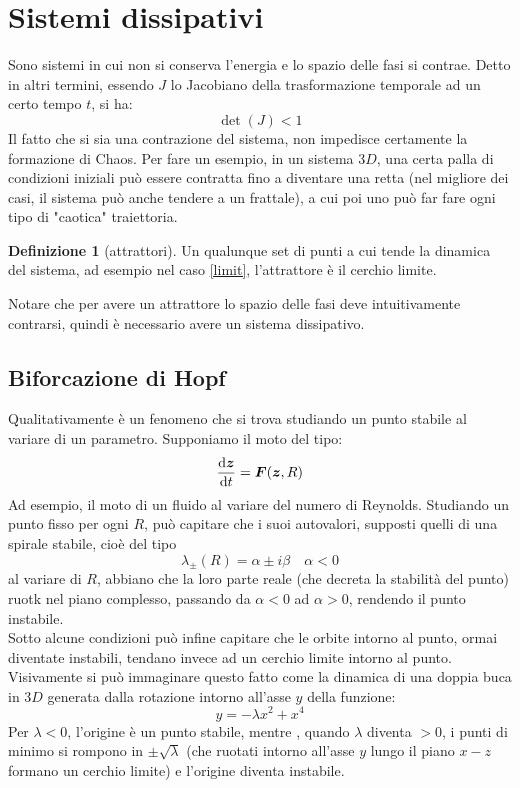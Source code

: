 \documentclass[a4paper,12pt]{article}
\theoremstyle{plain}
\renewcommand{\vec}[1]{{\boldsymbol{#1}}}
\theoremstyle{definition}
\newtheorem{defn}{Definizione}[section]
\theoremstyle{remark}
\begin{document}
	\section{Sistemi dissipativi}
Sono sistemi in cui non si conserva l'energia e lo spazio delle fasi si contrae. Detto in altri termini, essendo $J$ lo Jacobiano della trasformazione temporale ad un certo tempo $t$, si ha:
\[\det(J)<1\]
Il fatto che si sia una contrazione del sistema, non impedisce certamente la formazione di Chaos. Per fare un esempio, in un sistema $3D$, una certa palla di condizioni iniziali può essere contratta fino a diventare una retta (nel migliore dei casi, il sistema può anche tendere a un frattale), a cui poi uno può far fare ogni tipo di "caotica" traiettoria.
\begin{defn}[attrattori]
	Un qualunque set di punti a cui tende la dinamica del sistema, ad esempio nel caso \ref{limit}, l'attrattore è il cerchio limite.
	
\end{defn}
Notare che per avere un attrattore lo spazio delle fasi deve intuitivamente contrarsi,  quindi è necessario avere un sistema dissipativo.

\subsection{Biforcazione di Hopf}
Qualitativamente è un fenomeno che si trova studiando un punto stabile al variare di un parametro.
Supponiamo il moto del tipo:
\[\dv{\vec{z}}{t}=\vec{F}(\vec{z},R)\]
Ad esempio, il moto di un fluido al variare del numero di Reynolds.
Studiando un punto fisso per ogni $R$, può capitare che i suoi autovalori, supposti quelli di una spirale stabile, cioè del tipo
\[\lambda_\pm(R)=\alpha\pm i\beta	\quad \alpha<0	\]
al variare di $R$, abbiano che la loro parte reale (che decreta la stabilità del punto) ruotk nel piano complesso, passando da $\alpha<0$ ad $\alpha>0$, rendendo il punto instabile.
\\Sotto alcune condizioni può infine capitare che le orbite intorno al punto, ormai diventate instabili, tendano invece ad un cerchio limite intorno al punto. Visivamente si può immaginare questo fatto come la dinamica di una doppia buca in $3D$ generata dalla rotazione intorno all'asse $y$ della funzione:
\[y=-\lambda x^2+ x^4\]
Per $\lambda<0$, l'origine è un punto stabile, mentre , quando $\lambda$ diventa $>0$, i punti di minimo si rompono in $\pm\sqrt{\lambda}$ (che ruotati intorno all'asse $y$ lungo il piano $x-z$ formano un cerchio limite) e l'origine diventa instabile.
\end{document}
